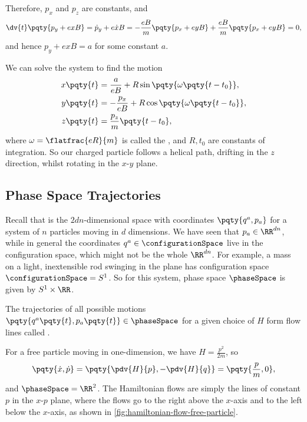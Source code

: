 \begin{example}
    Therefore, \(p_x\) and \(p_z\) are constants, and
    \begin{equation}
        \dv{t} \pqty{p_y + e x B} = \dot{p}_y + e \dot{x} B = - \frac{e B}{m} \pqty{p_x + e y B} + \frac{e B}{m} \pqty{p_x + e y B} = 0,
    \end{equation}
    and hence \(p_y + e x B = a\) for some constant \(a\).

    We can solve the system to find the motion
    \begin{subequations}
        \begin{align}
            x\pqty{t} &= \frac{a}{eB} + R \sin \pqty{\omega \pqty{t - t_0}}, \\
            y\pqty{t} &= - \frac{p_x}{eB} + R \cos \pqty{\omega \pqty{t - t_0}}, \\
            z\pqty{t} &= \frac{p_z}{m} \pqty{t - t_0},
        \end{align}
    \end{subequations}
    where \(\omega = \flatfrac{eR}{m}\) is called the , and \(R, t_0\) are constants of integration. So our charged particle follows a helical path, drifting in the \(z\) direction, whilst rotating in the \(x\)-\(y\) plane. 
\end{example}

\subsection{Phase Space Trajectories}

Recall that  is the \(2dn\)-dimensional space with coordinates \(\pqty{q^a, p_a}\) for a system of \(n\) particles moving in \(d\) dimensions. We have seen that \(p_a \in \RR^{dn}\), while in general the coordinates \(q^a \in \configurationSpace\) live in the configuration space, which might not be the whole \(\RR^{dn}\). For example, a mass on a light, inextensible rod swinging in the plane has configuration space \(\configurationSpace = S^1\). So for this system, phase space \(\phaseSpace\) is given by \(S^1 \times \RR\).

The trajectories of all possible motions \(\pqty{q^a\pqty{t}, p_a\pqty{t}} \in \phaseSpace\) for a given choice of \(H\) form flow lines called .

\begin{example}
    For a free particle moving in one-dimension, we have \(H = \frac{p^2}{2m}\), so
    \begin{equation}
        \pqty{\dot{x}, \dot{p}} = \pqty{\pdv{H}{p}, -\pdv{H}{q}} = \pqty{\frac{p}{m}, 0},
    \end{equation}
    and \(\phaseSpace = \RR^2\). The Hamiltonian flows are simply the lines of constant \(p\) in the \(x\)-\(p\) plane, where the flows go to the right above the \(x\)-axis and to the left below the \(x\)-axis, as shown in \autoref{fig:hamiltonian-flow-free-particle}.
\end{example}


